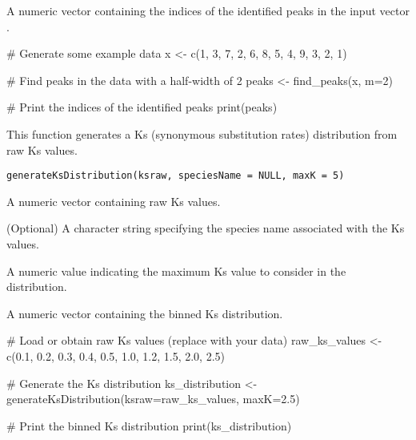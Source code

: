 \documentclass[a4paper]{book}
\begin{document}
%
\begin{Value}
A numeric vector containing the indices of the identified peaks in the input vector .
\end{Value}
%
\begin{Examples}
\begin{ExampleCode}
# Generate some example data
x <- c(1, 3, 7, 2, 6, 8, 5, 4, 9, 3, 2, 1)

# Find peaks in the data with a half-width of 2
peaks <- find_peaks(x, m=2)

# Print the indices of the identified peaks
print(peaks)
\end{ExampleCode}
\end{Examples}
%
\begin{Description}\relax
This function generates a Ks (synonymous substitution rates) distribution from raw Ks values.
\end{Description}
%
\begin{Usage}
\begin{verbatim}
generateKsDistribution(ksraw, speciesName = NULL, maxK = 5)
\end{verbatim}
\end{Usage}
%
\begin{Arguments}
\begin{ldescription}
\item[\code{ksraw}] A numeric vector containing raw Ks values.

\item[\code{speciesName}] (Optional) A character string specifying the species name associated with the Ks values.

\item[\code{maxK}] A numeric value indicating the maximum Ks value to consider in the distribution.
\end{ldescription}
\end{Arguments}
%
\begin{Value}
A numeric vector containing the binned Ks distribution.
\end{Value}
%
\begin{Examples}
\begin{ExampleCode}
# Load or obtain raw Ks values (replace with your data)
raw_ks_values <- c(0.1, 0.2, 0.3, 0.4, 0.5, 1.0, 1.2, 1.5, 2.0, 2.5)

# Generate the Ks distribution
ks_distribution <- generateKsDistribution(ksraw=raw_ks_values, maxK=2.5)

# Print the binned Ks distribution
print(ks_distribution)
\end{ExampleCode}
\end{Examples}
\end{document}
